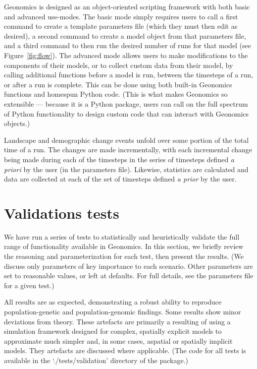 ﻿\documentclass{article}
\begin{document}
Geonomics is designed as an object-oriented scripting framework with both basic and advanced use-modes.
The basic mode simply requires users to call a first command to create a template
parameters file (which they must then edit as desired), a second command to create
a model object from that parameters file, and a third command to then run the desired number
of runs for that model (see Figure~\ref{fig:flow}).
The advanced mode allows users to make modifications to the components of their models,
or to collect custom data from their model, by calling additional functions
before a model is run, between the timesteps of a run, or after a run is complete.
This can be done using both built-in Geonomics functions and homespun Python code.
(This is what makes Geonomics so extensible --- because it is a Python package, users can call on
the full spectrum of Python functionality to design custom code that can interact with Geonomics objects.)

Landscape and demographic change events unfold over some portion of the total time of a run.
The changes are made incrementally, with each incremental change being made 
during each of the timesteps in the series of timesteps defined \emph{a priori} by the user (in the parameters file).
Likewise, statistics are calculated and data are collected
at each of the set of timesteps defined \emph{a prior} by the user.


\section{Validations tests}
We have run a series of tests to statistically and heuristically validate
the full range of functionality available in Geonomics.
In this section, we briefly review the reasoning and parameterization for each test,
then present the results.
(We discuss only parameters of key importance to each scenario.
Other parameters are set to reasonable values, or left at defaults.
For full details, see the parameters file for a given test.)

All results are as expected, demonstrating a robust ability to reproduce 
population-genetic and population-genomic findings.
Some results show minor deviations from theory.
These artefacts are primarily a resulting of using a simulation framework
designed for complex, spatially explicit models 
to approximate much simpler and, in some cases, aspatial or spatially implicit models.
They artefacts are discussed where applicable.
(The code for all tests is available in the `./tests/validation' directory of the package.)
\end{document}
